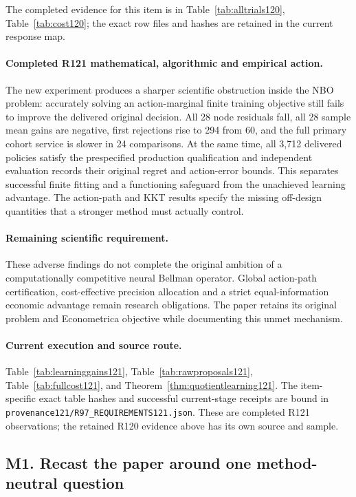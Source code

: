 The completed evidence for this item is in Table~\ref{tab:alltrials120}, Table~\ref{tab:cost120}; the exact row files and hashes are retained in the current response map.

\paragraph{Completed R121 mathematical, algorithmic and empirical action.}
The new experiment produces a sharper scientific obstruction inside the NBO problem: accurately solving an action-marginal finite training objective still fails to improve the delivered original decision. All 28 node residuals fall, all 28 sample mean gains are negative, first rejections rise to 294 from 60, and the full primary cohort service is slower in 24 comparisons. At the same time, all 3,712 delivered policies satisfy the prespecified production qualification and independent evaluation records their original regret and action-error bounds. This separates successful finite fitting and a functioning safeguard from the unachieved learning advantage. The action-path and KKT results specify the missing off-design quantities that a stronger method must actually control.

\paragraph{Remaining scientific requirement.}
These adverse findings do not complete the original ambition of a computationally competitive neural Bellman operator. Global action-path certification, cost-effective precision allocation and a strict equal-information economic advantage remain research obligations. The paper retains its original problem and Econometrica objective while documenting this unmet mechanism.

\paragraph{Current execution and source route.}
Table~\ref{tab:learninggains121}, Table~\ref{tab:rawproposals121}, Table~\ref{tab:fullcost121}, and Theorem~\ref{thm:quotientlearning121}.
The item-specific exact table hashes and successful current-stage receipts are bound in \nolinkurl{provenance121/R97_REQUIREMENTS121.json}. These are completed R121 observations; the retained R120 evidence above has its own source and sample.

\subsection{M1. Recast the paper around one method-neutral question}
\label{response121:M1}

